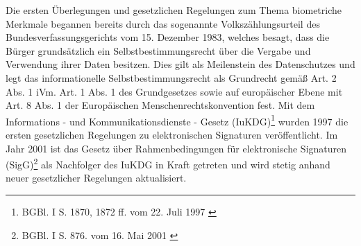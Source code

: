 Die ersten Überlegungen und gesetzlichen Regelungen zum Thema biometriche Merkmale begannen bereits durch
das sogenannte Volkszählungsurteil des Bundesverfassungsgerichts vom 15. Dezember 1983, welches besagt, dass
die Bürger grundsätzlich ein Selbstbestimmungsrecht über die Vergabe und Verwendung ihrer Daten besitzen.
Dies gilt als Meilenstein des Datenschutzes und legt das informationelle Selbstbestimmungsrecht als
Grundrecht gemäß Art. 2 Abs. 1 iVm. Art. 1 Abs. 1 des Grundgesetzes sowie auf europäischer Ebene mit Art. 8
Abs. 1 der Europäischen Menschenrechtskonvention fest. \cite{grundlagen1}\cite{grundlagen2}\cite{grundlagen3} 
Mit dem Informations - und Kommunikationsdienste - Gesetz (IuKDG)\footnote{\label{foot:2}BGBl. I S. 1870,
1872 ff. vom 22. Juli 1997 \cite{grundlagenFN1}} wurden 1997 die ersten gesetzlichen Regelungen zu elektronischen
Signaturen veröffentlicht. Im Jahr 2001 ist das Gesetz über Rahmenbedingungen für elektronische Signaturen
(SigG)\footnote{\label{foot:3}BGBl. I S. 876. vom 16. Mai 2001 \cite{grundlagenFN2}} als Nachfolger des
IuKDG in Kraft getreten und wird stetig anhand neuer gesetzlicher Regelungen aktualisiert. \cite{grundlagen4}
